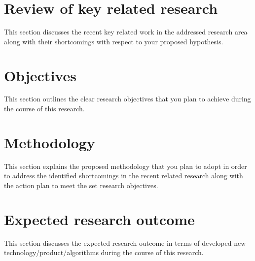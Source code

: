 \documentclass[12pt,a4paper]{article}
\newlength{\defbaselineskip}
\newcommand{\setlinespacing}[1]%
           {\setlength{\baselineskip}{#1 \defbaselineskip}}
\begin{document}
\section{Review of key related research}
This section discusses the recent key related work in the addressed research area along with their shortcomings with respect to your proposed hypothesis.
\section{Objectives}
This section outlines the clear research objectives that you plan to achieve during the course of this research.
\section{Methodology}
This section explains the proposed methodology that you plan to adopt in order to address the identified shortcomings in the recent related research along with the action plan to meet the set research objectives.
\section{Expected research outcome}
This section discusses the expected research outcome in terms of developed new technology/product/algorithms during the course of this research.
\setlinespacing{1}

\newpage

\end{document}
